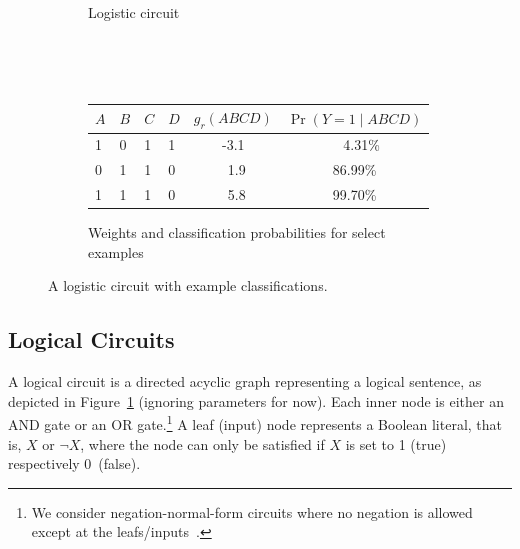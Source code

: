 \documentclass[letterpaper]{article} %
\begin{document}
\begin{figure}[t]
\begin{subfigure}[t]{0.48\textwidth}
{
 }
		\caption{Logistic circuit\label{fig: logistic circuit}}
	\end{subfigure}
	\quad~\par~\par
	\begin{subfigure}[t]{0.48\textwidth}
		\centering
\begin{sc}
{\fontsize{9}{9}\selectfont
        \begin{tabular}{ @{} llll c c@{} }
         \toprule
          $A$ & $B$ & $C$ & $D$  &  $g_r(ABCD) $& $\Pr(Y=1 \mid ABCD)$ \\
         \midrule \midrule
                        1 & 0 & 1 & 1 & -3.1 & ~~4.31\%\\
        0 & 1 & 1 & 0 & ~1.9 & 86.99\%\\
                1 & 1 & 1 & 0 &~5.8 &99.70\%\\
          \bottomrule
      	\end{tabular}
	}
          \end{sc}
		\caption{Weights and classification probabilities for select examples}\label{fig: posterior distribution}
	\end{subfigure}
	\caption{A logistic circuit with example classifications.}\label{fig:1}
\end{figure}

\subsection{Logical Circuits}

A logical circuit is a directed acyclic graph  representing a logical sentence, as depicted in Figure~\ref{fig: logistic circuit} (ignoring parameters for now).
Each inner node is either an AND gate or an OR gate.\footnote{We consider negation-normal-form circuits where no negation is allowed except at the leafs/inputs~\cite{darwicheJAIR02}.}
A leaf (input) node represents a Boolean literal, that is, $X$ or $\neg X$, where the node can only be satisfied if $X$ is set to 1 (true) respectively 0~(false).
\end{document}
